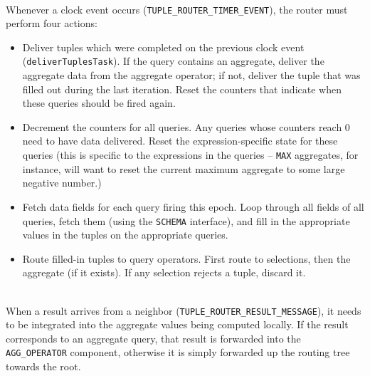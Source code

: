 \documentclass[11pt]{article}
\begin{document}
\vspace{1em}
\\
Whenever a clock event occurs ({\tt TUPLE\_ROUTER\_TIMER\_EVENT}), the
  router must perform four actions:
\begin{itemize}

\item Deliver tuples which were completed on the previous clock event
  ({\tt deliverTuplesTask}).  If the query contains an aggregate,
  deliver the aggregate data from the aggregate operator;  if not,
  deliver the tuple that was filled out during the last
  iteration. Reset the counters that  indicate when these queries
  should be fired again.
  
\item Decrement the counters for all queries.  Any queries whose
  counters reach 0 need to have data delivered.  Reset the
  expression-specific state for these queries (this is specific
  to the expressions in the queries -- {\tt MAX} aggregates, for instance,
  will want to reset the current maximum aggregate to some large
  negative number.)

\item Fetch data fields for each query firing this epoch.  Loop
  through all fields of all queries, fetch them (using the {\tt SCHEMA}
  interface), and fill in the appropriate values in the tuples
  on the appropriate queries.  
  
\item Route filled-in tuples to query operators.  First route to
  selections, then the aggregate (if it exists).  If any selection
  rejects a tuple, discard it.

\end{itemize}

\vspace{1em}
\\
  When a result arrives from a neighbor ({\tt TUPLE\_ROUTER\_RESULT\_MESSAGE}),
  it needs to be integrated into the aggregate values being computed
  locally.  If the result corresponds to an aggregate query, that result
  is forwarded into the {\tt AGG\_OPERATOR} component, otherwise it is 
  simply forwarded up the routing tree towards the root.
\end{document}
